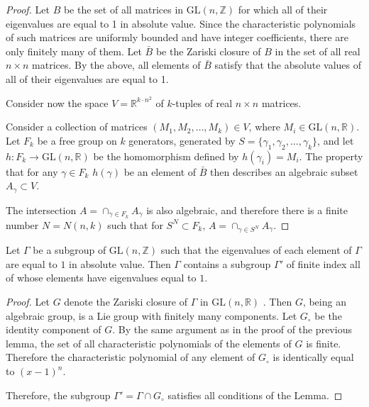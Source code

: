 \documentclass{amsart}
\begin{document}
\begin{proof}

Let $B$ be the set of all matrices in $\mathrm{GL}(n,\mathbb{Z})$
for which all of their eigenvalues are equal to 1 in absolute value.
Since the characteristic polynomials of such matrices
are uniformly bounded and have integer coefficients,
there are only finitely many of them.
Let $\bar{B}$ be the Zariski closure of $B$ in the set of all real
$n\times n$ matrices. By the above,
all elements of $\bar{B}$ satisfy that the absolute values of all
of their eigenvalues are equal to 1.

Consider now the space $V=\mathbb{R}^{k{\cdot}n^{2}}$ of
$k$-tuples of real $n\times n$ matrices.

Consider a  collection of matrices $(M_1,M_2,\dots,M_k)\in V$,
where $M_i\in \mathrm{GL}(n,\mathbb{R})$.
Let $F_k$ be a free group on $k$ generators,
generated by $S=\{\gamma_1,\gamma_2,\dots,\gamma_k\}$,
and let $h\colon F_k\to \mathrm{GL}(n,\mathbb{R})$ be the
homomorphism defined by $h(\gamma_i)=M_i$.
The property that for any $\gamma\in F_k$ $h(\gamma)$
be an element of $\bar{B} $
then describes an algebraic subset $A_\gamma\subset V$.

The  intersection $A=\cap_{\gamma\in F_k}A_\gamma$
is also  algebraic, and therefore there is a finite number $N=N(n,k)$
such that for $S^N\subset  F_k$,
$A=\cap_{\gamma\in S^N}A_\gamma$.
\end{proof}

\begin{lem}\label{lem:eigen1}
Let $\Gamma$  be a subgroup of $\mathrm{GL}(n,\mathbb{Z})$ such that
the eigenvalues of each element of $\Gamma$
are equal to $1$ in  absolute value.
Then $\Gamma$ contains a   subgroup  $\Gamma'$ of finite index
all of whose  elements have eigenvalues equal to $1$.
\end{lem}

\begin{proof}
Let $G$ denote the Zariski closure of $\Gamma$ in  $\mathrm{GL}(n,\mathbb{R})$ .
Then $G$, being an algebraic group,
is a Lie group with finitely many components.
Let $G_\circ$ be the identity  component of $G$.
By the same argument as in the proof of the previous lemma,
the set of all characteristic polynomials
of the elements of $G$ is finite.
Therefore the characteristic polynomial
of any element of $G_\circ$
is identically equal to $(x-1)^n$.

Therefore, the subgroup $\Gamma'=\Gamma\cap G_\circ$
satisfies all conditions of the Lemma.
\end{proof}
\end{document}
